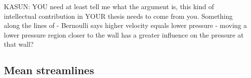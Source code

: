 
KASUN: YOU need at least tell me what the argument is, this kind of intellectual
 contribution in YOUR thesis needs to come from you. Something along the lines of - Bernoulli says higher velocity equals lower pressure - moving a lower pressure region closer to the wall has a greater influence on the pressure at that wall?

%
%
%
%
%
%
%


\subsection{Mean streamlines}




%
%

